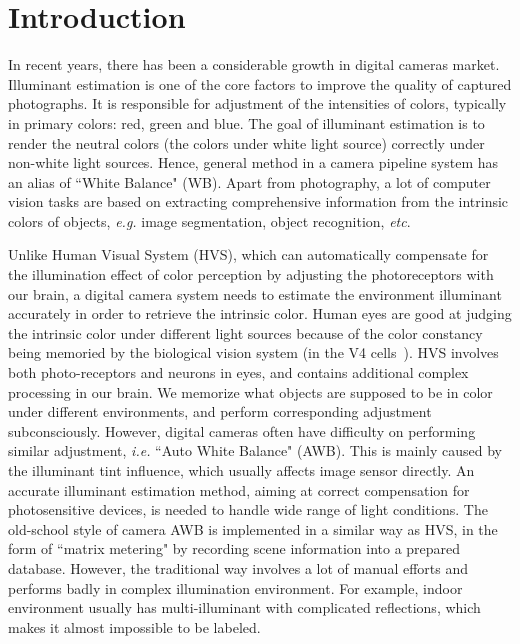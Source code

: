 \documentclass[10pt,twocolumn,letterpaper]{article}
\begin{document}
\section{Introduction}

In recent years, there has been a considerable growth in digital cameras market.
Illuminant estimation is one of the core factors to improve the quality of captured photographs.
It is responsible for adjustment of the intensities of colors,
typically in primary colors: red, green and blue.
The goal of illuminant estimation is to render the neutral colors (the colors under white light source) correctly under non-white light sources.
Hence, general method in a camera pipeline system has an alias of ``White Balance" (WB).
Apart from photography, a lot of computer vision tasks are based on extracting comprehensive information from
the intrinsic colors of objects, \textit{e.g.} image segmentation, object recognition, \textit{etc}.

Unlike Human Visual System (HVS), which can automatically compensate for the illumination effect
of color perception by adjusting the photoreceptors with our brain,
a digital camera system needs to estimate the environment illuminant
accurately in order to retrieve the intrinsic color.
Human eyes are good at judging the intrinsic color under different light sources
because of the color constancy being memoried by the biological vision system (in the V4 cells~\cite{khalil2015biologically}).
HVS involves both photo-receptors and neurons in eyes,
and contains additional complex processing in our brain.
We memorize what objects are supposed to be in color under different environments,
and perform corresponding adjustment subconsciously.
However, digital cameras often have difficulty on performing similar adjustment, \textit{i.e.} ``Auto White Balance" (AWB).
This is mainly caused by the illuminant tint influence, which usually affects image sensor directly.
An accurate illuminant estimation method, aiming at correct compensation for photosensitive devices, is needed to handle wide range of light conditions.
The old-school style of camera AWB is implemented in a similar way as HVS,
in the form of ``matrix metering" by recording scene information into a prepared database.
However, the traditional way involves a lot of manual efforts and performs badly in complex illumination environment.
For example, indoor environment usually has multi-illuminant with complicated reflections, which
makes it almost impossible to be labeled.
\end{document}
